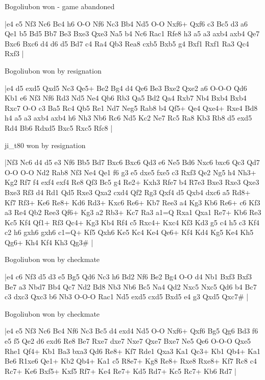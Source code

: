 \showboard

Bogoliubon won - game abandoned

\makegametitle
|e4 e5 Nf3 Nc6 Bc4 h6 O-O Nf6 Nc3 Bb4 Nd5 O-O Nxf6+ Qxf6 c3 Bc5 d3 a6 Qe1 b5 Bd5 Bb7 Be3 Bxe3 Qxe3 Na5 b4 Nc6 Rac1 Rfe8 h3 a5 a3 axb4 axb4 Qe7 Bxc6 Bxc6 d4 d6 d5 Bd7 c4 Ra4 Qb3 Rea8 cxb5 Bxb5 g4 Bxf1 Rxf1 Ra3 Qc4 Rxf3  |

\showboard

Bogoliubon won by resignation

\makegametitle
|e4 d5 exd5 Qxd5 Nc3 Qe5+ Be2 Bg4 d4 Qe6 Be3 Bxe2 Qxe2 a6 O-O-O Qd6 Kb1 e6 Nf3 Nf6 Rd3 Nd5 Ne4 Qb6 Rb3 Qa5 Bd2 Qa4 Rxb7 Nb4 Bxb4 Bxb4 Rxc7 O-O c3 Ba5 Rc4 Qb5 Re1 Nd7 Neg5 Rab8 b4 Qf5+ Qe4 Qxe4+ Rxe4 Bd8 h4 a5 a3 axb4 axb4 h6 Nh3 Nb6 Rc6 Nd5 Kc2 Ne7 Rc5 Ra8 Kb3 Rb8 d5 exd5 Rd4 Bb6 Rdxd5 Bxc5 Rxc5 Rfc8  |

\showboard

ji\_t80 won by resignation

\makegametitle
|Nf3 Nc6 d4 d5 e3 Nf6 Bb5 Bd7 Bxc6 Bxc6 Qd3 e6 Ne5 Bd6 Nxc6 bxc6 Qc3 Qd7 O-O O-O Nd2 Rab8 Nf3 Ne4 Qe1 f6 g3 e5 dxe5 fxe5 c3 Rxf3 Qe2 Ng5 h4 Nh3+ Kg2 Rf7 f4 exf4 exf4 Re8 Qf3 Bc5 g4 Re2+ Kxh3 Rfe7 b4 R7e3 Bxe3 Rxe3 Qxe3 Bxe3 Rf3 d4 Rd1 Qd5 Rxe3 Qxa2 cxd4 Qf2 Rg3 Qxf4 d5 Qxb4 dxc6 a5 Rd8+ Kf7 Rf3+ Ke6 Re8+ Kd6 Rd3+ Kxc6 Re6+ Kb7 Ree3 a4 Kg3 Kb6 Re6+ c6 Kf3 a3 Re4 Qb2 Ree3 Qf6+ Kg3 a2 Rb3+ Kc7 Ra3 a1=Q Rxa1 Qxa1 Re7+ Kb6 Re3 Kc5 Kf4 Qf1+ Rf3 Qc4+ Kg3 Kb4 Rf4 c5 Rxc4+ Kxc4 Kf3 Kd3 g5 c4 h5 c3 Kf4 c2 h6 gxh6 gxh6 c1=Q+ Kf5 Qxh6 Ke5 Kc4 Ke4 Qe6+ Kf4 Kd4 Kg5 Ke4 Kh5 Qg6+ Kh4 Kf4 Kh3 Qg3\#  |

\showboard

Bogoliubon won by checkmate

\makegametitle
|e4 c6 Nf3 d5 d3 e5 Bg5 Qd6 Nc3 h6 Bd2 Nf6 Be2 Bg4 O-O d4 Nb1 Bxf3 Bxf3 Be7 a3 Nbd7 Bb4 Qc7 Nd2 Bd8 Nb3 Nb6 Bc5 Na4 Qd2 Nxc5 Nxc5 Qd6 b4 Bc7 c3 dxc3 Qxc3 b6 Nb3 O-O-O Rac1 Nd5 exd5 cxd5 Bxd5 e4 g3 Qxd5 Qxc7\#  |

\showboard

Bogoliubon won by checkmate

\makegametitle
|e4 e5 Nf3 Nc6 Bc4 Nf6 Nc3 Bc5 d4 exd4 Nd5 O-O Nxf6+ Qxf6 Bg5 Qg6 Bd3 f6 e5 f5 Qe2 d6 exd6 Re8 Be7 Rxe7 dxe7 Nxe7 Qxe7 Bxe7 Ne5 Qe6 O-O-O Qxe5 Rhe1 Qf4+ Kb1 Ba3 bxa3 Qd6 Re8+ Kf7 Rde1 Qxa3 Ka1 Qc3+ Kb1 Qb4+ Ka1 Be6 R1xe6 Qe1+ Kb2 Qb4+ Ka1 c5 R8e7+ Kg8 Re8+ Rxe8 Rxe8+ Kf7 Rc8 c4 Rc7+ Ke6 Bxf5+ Kxf5 Rf7+ Ke4 Re7+ Kd5 Rd7+ Kc5 Rc7+ Kb6 Rd7  |

